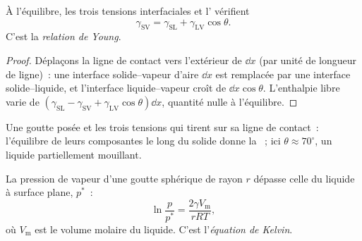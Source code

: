 \begin{theorem}\label{thm:b3:colloids:young}
À l'équilibre, les trois tensions interfaciales et l'
vérifient
\[
  \gamma_{\mathrm{SV}} = \gamma_{\mathrm{SL}} + \gamma_{\mathrm{LV}}\cos\theta .
\]
C'est la \emph{relation de Young}.
\end{theorem}

\begin{proof}
Déplaçons la ligne de contact vers l'extérieur de $\dd x$ (par unité de
longueur de ligne)~: une interface solide--vapeur d'aire $\dd x$ est
remplacée par une interface solide--liquide, et l'interface
liquide--vapeur croît de $\dd x\cos\theta$. L'enthalpie libre varie de
$(\gamma_{\mathrm{SL}} - \gamma_{\mathrm{SV}} + \gamma_{\mathrm{LV}}\cos\theta)\dd x$,
quantité nulle à l'équilibre.
\end{proof}

\begin{omfigure}

{\small Une goutte posée et les trois tensions qui tirent sur sa ligne de
contact~: l'équilibre de leurs composantes le long du solide donne la
~; ici $\theta
\approx 70^\circ$, un liquide partiellement mouillant.}
\end{omfigure}

\begin{theorem}\label{thm:b3:colloids:kelvin}
La pression de vapeur d'une goutte sphérique de rayon $r$ dépasse celle
du liquide à surface plane, $p^*$~:
\[
  \ln\frac{p}{p^*} = \frac{2\gamma V_{\mathrm m}}{rRT},
\]
où $V_{\mathrm m}$ est le volume molaire du liquide. C'est
l'\emph{équation de Kelvin}.
\end{theorem}

